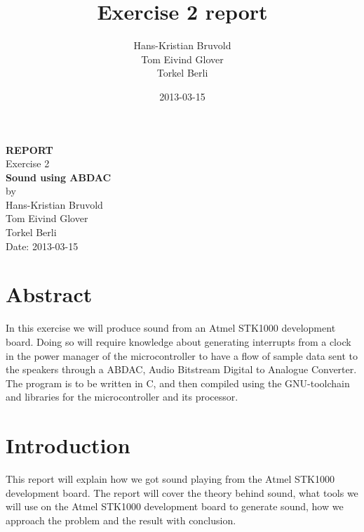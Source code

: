\documentclass[12pt,a4paper,final]{report}
\author{Hans-Kristian Bruvold\\Tom Eivind Glover\\Torkel Berli}
\title{Exercise 2 report}
\date{2013-03-15}
\numberwithin{equation}{section}
\numberwithin{table}{section}
\numberwithin{figure}{section}
\begin{document}
\begin{titlepage} %

\pagestyle{fancy}
\rhead{}
\cfoot{}
\begin{center}

\bigskip
\textbf{\LARGE REPORT}\\
\vspace{1.5cm}
\textnormal{\LARGE Exercise 2}\\
\vspace{1cm}
\textbf{\LARGE Sound using ABDAC}\\

\vspace{3cm}
by
\\
\vspace{0.5cm}
Hans-Kristian Bruvold\\
Tom Eivind Glover\\
Torkel Berli\\


\vspace{9cm}
Date: 2013-03-15

\end{center}

\end{titlepage} %

\pagestyle{fancy}
\chead{}
\lhead{}


\section*{Abstract}
\label{sec:abstract} %

In this exercise we will produce sound from an Atmel STK1000 development board. Doing so will require knowledge about generating interrupts from a clock in the power manager of the microcontroller to have a flow of sample data sent to the speakers through a ABDAC, Audio Bitstream Digital to Analogue Converter. The program is to be written in C, and then compiled using the GNU-toolchain and libraries for the microcontroller and its processor.

\newpage

\tableofcontents

\newpage

\clearpage
{}

\cfoot{\thepage}

\section{Introduction}
\label{sec:introduction}
This report will explain how we got sound playing from the Atmel STK1000 development board. The report will cover the theory behind sound, what tools we will use on the Atmel STK1000 development board to generate sound, how we approach the problem and the result with conclusion.
\end{document}
